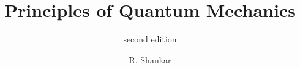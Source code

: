 \documentclass[graybox,envcountchap,sectrefs]{style/svmono}
\begin{document}
\author{R. Shankar}
\title{Principles of Quantum Mechanics}
\subtitle{second edition}
\maketitle

\frontmatter%

%
%
%
%

\tableofcontents




\mainmatter%
%


%
%

\backmatter%


\printindex

\end{document}
